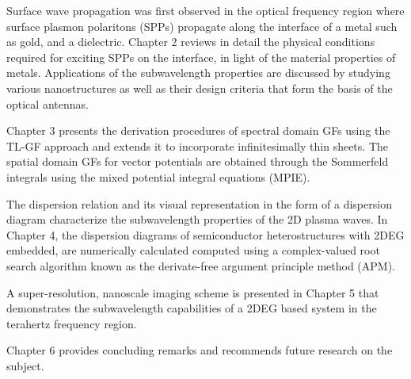 Surface wave propagation was first observed in the optical frequency region where surface plasmon polaritons (SPPs) propagate along the interface of a metal such as gold, and a dielectric. Chapter 2 reviews in detail the physical conditions required for exciting SPPs on the interface, in light of the material properties of metals. Applications of the subwavelength properties are discussed by studying various nanostructures as well as their design criteria that form the basis of the optical antennas.

Chapter 3 presents the derivation procedures of spectral domain GFs using the TL-GF approach \cite{Michalski1997,Michalski2005} and extends it to incorporate infinitesimally thin sheets. The spatial domain GFs for vector potentials are obtained through the Sommerfeld integrals using the mixed potential integral equations (MPIE).

The dispersion relation and its visual representation in the form of a dispersion diagram characterize the subwavelength properties of the 2D plasma waves. In Chapter 4, the dispersion diagrams of semiconductor heterostructures with 2DEG embedded, are numerically calculated computed using a complex-valued root search algorithm known as the derivate-free argument principle method (APM).

A super-resolution, nanoscale imaging scheme is presented in Chapter 5 that demonstrates the subwavelength capabilities of a 2DEG based system in the terahertz frequency region.

Chapter 6 provides concluding remarks and recommends future research on the subject.
